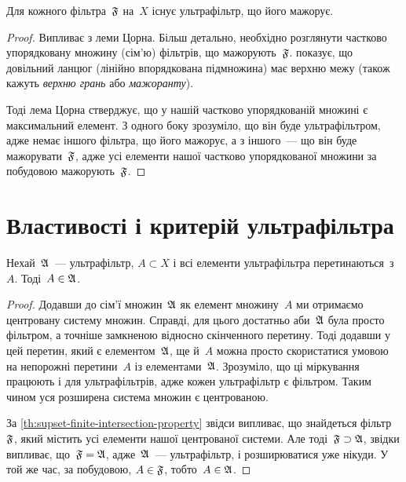 \begin{theorem}
    \label{th:every-filter-has-supset-ultrafilter}
    Для кожного фільтра~$\frak F$ на~$X$ існує ультрафільтр, що його мажорує.
\end{theorem}
\begin{proof}
    Випливає з леми Цорна. Більш детально, необхідно розглянути частково упорядковану множину (сім'ю) фільтрів, що мажорують~$\frak F$.  показує, що довільний ланцюг (лінійно впорядкована підмножина) має верхню межу (також кажуть \emph{верхню грань} або \emph{мажоранту}). 
    
    Тоді лема Цорна стверджує, що у нашій частково упорядкованій множині є максимальний елемент. З одного боку зрозуміло, що він буде ультрафільтром, адже немає іншого фільтра, що його мажорує, а з іншого~--- що він буде мажорувати~$\frak F$, адже усі елементи нашої частково упорядкованої множини за побудовою мажорують~$\frak F$.
\end{proof}

\section{Властивості і критерій ультрафільтра}

\begin{lemma}
    \label{lem:ultrafilter-absorbs-intersections}
    Нехай~$\frak A$~--- ультрафільтр, $A \subset X$ і всі елементи ультрафільтра перетинаються~з~$A$. Тоді~$A \in \frak A$.
\end{lemma}
\begin{proof}
    Додавши до сім'ї множин~$\frak A$ як елемент множину~$A$ ми отримаємо центровану систему множин. Справді, для цього достатньо аби~$\frak A$ була просто фільтром, а точніше замкненою відносно скінченного перетину. Тоді додавши у цей перетин, який є елементом~$\frak A$, ще й~$A$ можна просто скористатися умовою на непорожні перетини~$A$ із елементами~$\frak A$. Зрозуміло, що ці міркування працюють і для ультрафільтрів, адже кожен ультрафільтр є фільтром. Таким чином уся розширена система множин є центрованою. 
    
    За \cref{th:supset-finite-intersection-property} звідси випливає, що знайдеться фільтр~$\frak F$, який містить усі елементи нашої центрованої системи. Але тоді~$\frak F \supset \frak A$, звідки випливає, що~$\frak F = \frak A$, адже~$\frak A$~--- ультрафільтр, і розширюватися уже нікуди. У той же час, за побудовою, $A \in \frak F$, тобто~$A \in \frak A$.
\end{proof}

